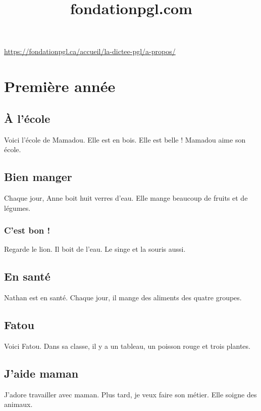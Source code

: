 \documentclass[11pt, french]{article}
\title{fondationpgl.com}
\begin{document}
\maketitle

\url{https://fondationpgl.ca/accueil/la-dictee-pgl/a-propos/}

\tableofcontents

\vfill

\section{Première année}

\subsection{À l'école}

Voici l'école de Mamadou. Elle est en bois. Elle est belle ! Mamadou aime son école.

\subsection{Bien manger}

Chaque jour, Anne boit huit verres d'eau. Elle mange beaucoup de fruits et de légumes.

\subsubsection{C'est bon !}

Regarde le lion. Il boit de l'eau. Le singe et la souris aussi.

\subsection{En santé}

Nathan est en santé. Chaque jour, il mange des aliments des quatre groupes.

\subsection{Fatou}

Voici Fatou. Dans sa classe, il y a un tableau, un poisson rouge et trois plantes.

\subsection{J'aide maman}

J'adore travailler avec maman. Plus tard, je veux faire son métier. Elle soigne des animaux.
\end{document}
